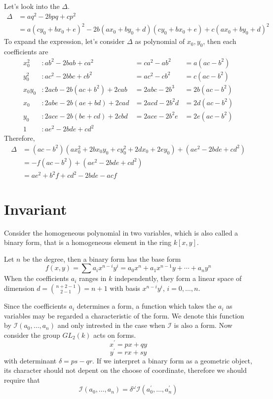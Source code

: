 \documentclass{article}
\begin{document}
Let's look into the $\Delta$. 
\begin{align*}
\Delta &= aq^2 - 2bpq + cp^2 \\
       &= a(cy_0 + bx_0 + e)^2 - 2b(ax_0 + by_0 + d)(cy_0 + bx_0 + e) + c(ax_0 + by_0 + d)^2
\end{align*}
To expand the expression, let's consider $\Delta$ as polynomial of $x_0, y_0$,
then each coefficients are
\begin{align*}
  x_0^2 &: ab^2 - 2b ab + ca^2 &= ca^2 - ab^2 &= a(ac - b^2)\\
  y_0^2 &: ac^2 - 2b bc + cb^2 &= ac^2 - cb^2 &= c(ac - b^2)\\
  x_0y_0 &: 2a cb - 2b (ac + b^2) + 2c ab &= 2abc - 2b^3 &= 2b(ac - b^2)\\
  x_0 &: 2a be - 2b(ae + bd) + 2c ad &= 2acd - 2b^2d &= 2d(ac - b^2) \\
  y_0 &: 2a ce - 2b(be + cd) + 2c bd &= 2ace - 2b^2e &= 2e(ac - b^2) \\
  1 &: ae^2 - 2bde + cd^2
\end{align*}
Therefore, 
\begin{align*}
\Delta &= (ac - b^2)(ax_0^2 + 2bx_0y_0 + cy_0^2 + 2dx_0 + 2ey_0) + (ae^2 - 2bde + cd^2) \\
       &= -f(ac - b^2) + (ae^2 - 2bde + cd^2) \\
       &= ae^2 + b^2f + cd^2 - 2bde - acf
\end{align*}

\section{Invariant}
Consider the homogeneous polynomial in two variables,
which is also called a binary form, 
that is a homogeneous element in the ring $k[x, y]$.

Let $n$ be the degree, then a binary form has the base form 
$$f(x, y) = \sum a_i x^{n-i} y^i = a_0 x^n + a_1 x^{n-1} y + \cdots + a_n y^n$$
When the coefficients $a_i$ ranges in $k$ independently, 
they form a linear space of dimension $d = {n + 2 - 1\choose 2 - 1} = n + 1$ 
with basis $x^{n-i}y^i$, $i = 0, \dots, n$.

Since the coefficients $a_i$ determines a form, a function which takes 
the $a_i$ as variables may be regarded a characteristic of the form.
We denote this function by $\mathcal I(a_0, \dots, a_n)$ and only 
intrested in the case when $\mathcal I$ is also a form.
Now consider the group $GL_2(k)$ acts on forms. 
$$x^\prime = px + qy$$
$$y^\prime = rx + sy$$
with determinant $\delta = ps - qr$.
If we interpret a binary form as a geometric object, 
its character should not depent on the choose of coordinate, 
therefore we should require that 
$$\mathcal I(a_0, \dots, a_n) = \delta^\omega \mathcal I(a_0^\prime, \dots, a_n^\prime)$$
\end{document}
